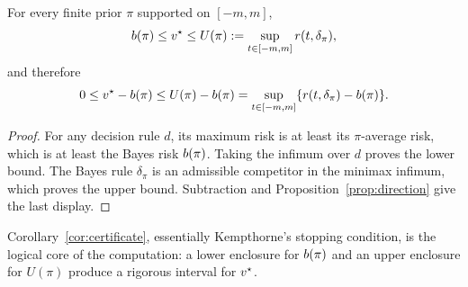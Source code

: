 \begin{corollary}
\label{cor:certificate}
For every finite prior $\pi$ supported on $[-m,m]$,
\[
 b(\pi)\le v^\star\le
 U(\pi):=\sup_{t\in[-m,m]}r(t,\delta_\pi),
\]
and therefore
\[
 0\le v^\star-b(\pi)
 \le U(\pi)-b(\pi)
 =\sup_{t\in[-m,m]}
   \{r(t,\delta_\pi)-b(\pi)\}.
\]
\end{corollary}

\begin{proof}
For any decision rule $d$, its maximum risk is at least its $\pi$-average
risk, which is at least the Bayes risk $b(\pi)$.  Taking the infimum over
$d$ proves the lower bound.  The Bayes rule $\delta_\pi$ is an admissible
competitor in the minimax infimum, which proves the upper bound.  Subtraction
and Proposition~\ref{prop:direction} give the last display.
\end{proof}

Corollary~\ref{cor:certificate}, essentially Kempthorne's stopping condition,
is the logical core of the computation: a lower enclosure for $b(\pi)$ and
an upper enclosure for $U(\pi)$ produce a rigorous interval for $v^\star$.
